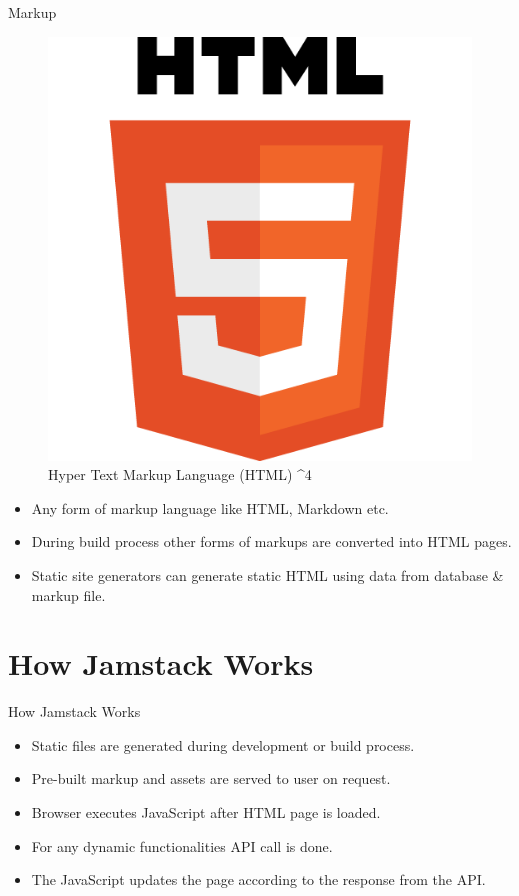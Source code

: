 \documentclass[aspectratio=169,9pt]{beamer}
\begin{document}
\begin{frame}{Markup}
    \begin{figure}
        \begin{center}
            \includegraphics[scale=.15]{./images/html.png}
            \caption{Hyper Text Markup Language (HTML) ^4}
        \end{center} 
    \end{figure}
\begin{itemize}
    \item Any form of markup language like HTML, Markdown etc.
    \item During build process other forms of markups are converted into HTML pages.
    \item Static site generators can generate static HTML using data from database & markup file.
\end{itemize} 
\end{frame}


\section{How Jamstack Works}

\begin{frame}{How Jamstack Works}
    \begin{itemize}
    \setlength{\itemsep}{.8em}
        \item Static files are generated during development or build process.
        \item Pre-built markup and assets are served to user on request.
        \item Browser executes JavaScript after HTML page is loaded.
        \item For any dynamic functionalities API call is done.
        \item The JavaScript updates the page according to the response from the API.
    \end{itemize}
    
\end{frame}
\end{document}
